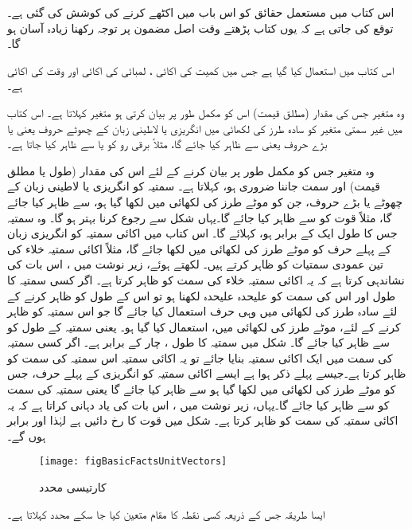 اس کتاب میں مستعمل حقائق کو اس باب میں اکٹھے کرنے کی کوشش کی گئی ہے۔ توقع کی جاتی ہے کہ یوں کتاب پڑھتے وقت اصل مضمون پر توجہ رکھنا زیادہ آسان ہو گا۔

اس کتاب میں   استعمال کیا گیا ہے جس میں کمیت کی اکائی ،  لمبائی کی اکائی  اور وقت کی اکائی  ہے۔

وہ متغیر جس کی مقدار (مطلق قیمت) اس کو مکمل طور پر بیان کرتی ہو    متغیر کہلاتا ہے۔ اس کتاب میں غیر سمتی متغیر کو سادہ طرز کی لکھائی میں انگریزی یا لاطینی زبان کے چھوٹے حروف  یعنی   یا بڑے حروف یعنی   سے ظاہر کیا جائے گا، مثلاً برقی رو کو  یا  سے ظاہر کیا جاتا ہے۔

وہ متغیر جس کو مکمل طور پر بیان کرنے کے لئے اس کی مقدار (طول یا مطلق قیمت) اور سمت جاننا ضروری ہو،   کہلاتا ہے۔ سمتیہ کو انگریزی یا لاطینی زبان کے چھوٹے یا  بڑے حروف،  جن کو موٹے طرز کی لکھائی میں لکھا گیا ہو،  سے ظاہر کیا جائے گا، مثلاً قوت کو  سے ظاہر کیا جائے گا۔یہاں شکل   سے رجوع کرنا بہتر ہو گا۔ وہ سمتیہ جس کا طول ایک کے برابر ہو،  کہلائے گا۔ اس کتاب میں اکائی سمتیہ کو انگریزی زبان کے پہلے حرف کو موٹے طرز کی لکھائی میں لکھا جائے گا، مثلاً اکائی سمتیہ  خلاء کی تین عمودی سمتیات  کو ظاہر کرتے ہیں۔ لکھتے ہوئے، زیر نوشت میں ، اس بات کی نشاندہی  کرتا ہے کہ یہ اکائی سمتیہ خلاء کی  سمت کو ظاہر کرتا ہے۔ اگر کسی سمتیہ  کا طول اور اس کی سمت کو علیحدہ علیحدہ لکھنا ہو تو اس کے طول کو ظاہر کرنے کے لئے سادہ طرز کی لکھائی میں وہی حرف استعمال کیا جائے گا جو اس سمتیہ کو ظاہر کرنے کے لئے، موٹے طرز کی لکھائی میں، استعمال کیا گیا ہو۔ یعنی سمتیہ  کے طول کو  سے ظاہر کیا جائے گا۔ شکل میں سمتیہ   کا طول ، چار کے برابر ہے۔ اگر کسی سمتیہ کی سمت میں ایک اکائی سمتیہ بنایا جائے تو یہ اکائی سمتیہ اس سمتیہ کی سمت کو ظاہر کرتا ہے۔جیسے پہلے ذکر ہوا ہے  ایسے اکائی سمتیہ کو انگریزی کے پہلے حرف،  جس کو موٹے طرز کی لکھائی میں لکھا گیا ہو  سے ظاہر کیا جائے گا یعنی سمتیہ  کی سمت کو  سے ظاہر کیا جائے گا۔یہاں،  زیر نوشت میں  ، اس بات کی یاد دہانی کراتا ہے کہ یہ اکائی سمتیہ  کی سمت کو ظاہر کرتا ہے۔ شکل  میں قوت  کا رخ دائیں  ہے لہٰذا   اور   برابر ہوں گے۔
\begin{figure}
\centering
\texttt{[image: figBasicFactsUnitVectors]}
\caption{کارتیسی محدد}
\label{شکل_حقائق_اکائی_سمتیہ}
\end{figure}
%
ایسا طریقہ جس کے ذریعہ کسی نقطہ کا مقام متعین کیا جا سکے محدد کہلاتا ہے۔

